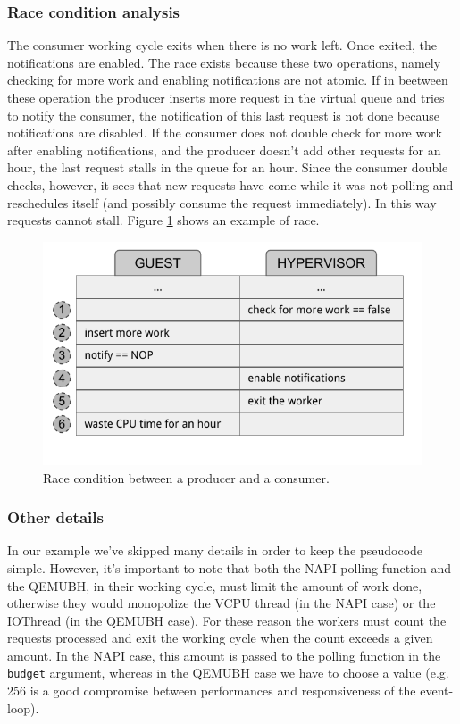 \subsubsection{Race condition analysis}
The consumer working cycle exits when there is no work left. Once exited, the notifications are enabled. The race exists because these
two operations, namely checking for more work and enabling notifications are not atomic. If in beetween these operation the producer
inserts more request in the virtual queue and tries to notify the consumer, the notification of this last request is not done because 
notifications are disabled. If the consumer does not double check for more work after enabling notifications, and the producer doesn't
add other requests for an hour, the last request stalls in the queue for an hour. Since the consumer double checks, however, it sees
that new requests have come while it was not polling and reschedules itself (and possibly consume the request immediately). In this
way requests cannot stall. Figure \ref{fig:race} shows an example of race.

\begin{figure}[bt]
\centering
\includegraphics[scale = 1.0]{race.pdf}
\caption{Race condition between a producer and a consumer.}
\label{fig:race}
\end{figure}


\subsubsection{Other details}
In our example we've skipped many details in order to keep the pseudocode simple. However, it's important to note that both the NAPI
polling function and the QEMUBH, in their working cycle, must limit the amount of work done, otherwise they would monopolize the VCPU
thread (in the NAPI case) or the IOThread (in the QEMUBH case). For these reason the workers must count the requests processed and
exit the working cycle when the count exceeds a given amount. In the NAPI case, this amount is passed to the polling function in the
\texttt{budget} argument, whereas in the QEMUBH case we have to choose a value (e.g. 256 is a good compromise between performances and
responsiveness of the event-loop).




